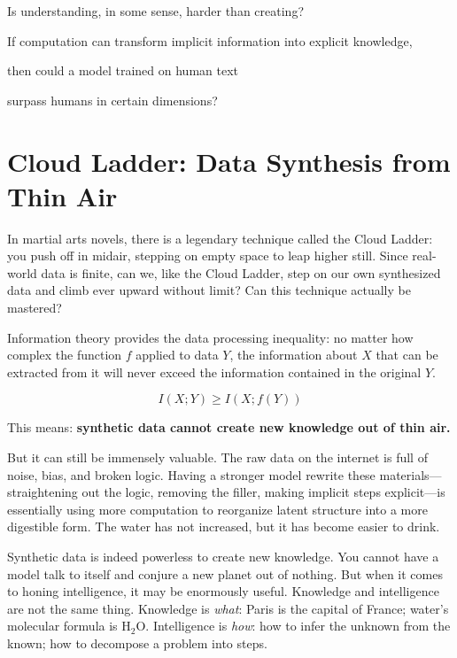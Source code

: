 \begin{thinkbox}

Is understanding, in some sense, harder than creating?

\vspace{1em}

If computation can transform implicit information into explicit knowledge,

then could a model trained on human text

surpass humans in certain dimensions?
\end{thinkbox}

\newpage
\section{Cloud Ladder: Data Synthesis from Thin Air}

In martial arts novels, there is a legendary technique called the Cloud Ladder: you push off in midair, stepping on empty space to leap higher still. Since real-world data is finite, can we, like the Cloud Ladder, step on our own synthesized data and climb ever upward without limit?
Can this technique actually be mastered?

Information theory provides the data processing inequality: no matter how complex the function $f$ applied to data $Y$, the information about $X$ that can be extracted from it will never exceed the information contained in the original $Y$.

\begin{equation*}
I(X; Y) \geq I(X; f(Y))
\end{equation*}

This means: \textbf{synthetic data cannot create new knowledge out of thin air.}

But it can still be immensely valuable. The raw data on the internet is full of noise, bias, and broken logic. Having a stronger model rewrite these materials---straightening out the logic, removing the filler, making implicit steps explicit---is essentially using more computation to reorganize latent structure into a more digestible form. The water has not increased, but it has become easier to drink.

\vspace{1em}

Synthetic data is indeed powerless to create new knowledge. You cannot have a model talk to itself and conjure a new planet out of nothing. But when it comes to honing intelligence, it may be enormously useful. Knowledge and intelligence are not the same thing.
Knowledge is \textit{what}: Paris is the capital of France; water's molecular formula is $\mathrm{H_2O}$.
Intelligence is \textit{how}: how to infer the unknown from the known; how to decompose a problem into steps.

